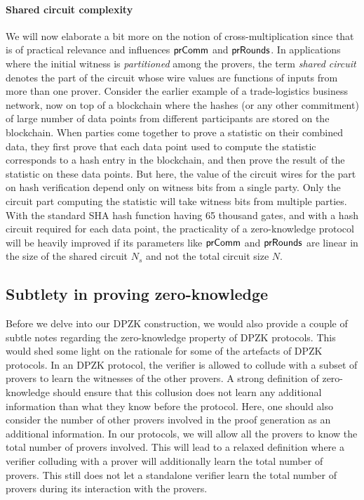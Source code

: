 \paragraph{Shared circuit complexity}
We will now elaborate a bit more on the notion of cross-multiplication since that is of practical relevance and influences $\mathsf{prComm}$ and $\mathsf{prRounds}$. In applications where the initial witness is \textit{partitioned} among the provers, the term \textit{shared circuit} denotes the part of the circuit whose wire values are functions of inputs from more than one prover. Consider the earlier example of a trade-logistics business network, now on top of a blockchain where the hashes (or any other commitment) of large number of data points from different participants are stored on the blockchain. When parties come together to prove a statistic on their combined data, they first prove that each data point used to compute the statistic corresponds to a hash entry in the blockchain, and then prove the result of the statistic on these data points. But here, the value of the circuit wires for the part on hash verification depend only on witness bits from a single party. Only the circuit part computing the statistic will take witness bits from multiple parties. With the standard SHA hash function having 65 thousand gates, and with a hash circuit required for each data point, the practicality of a zero-knowledge protocol will be heavily improved if its parameters like $\mathsf{prComm}$ and $\mathsf{prRounds}$ are linear in the size of the shared circuit $N_s$ and not the total circuit size $N$.


\subsection{Subtlety in proving zero-knowledge}
Before we delve into our DPZK construction, we would also provide a couple of subtle notes regarding the zero-knowledge property of DPZK protocols. This would shed some light on the rationale for some of the artefacts of DPZK protocols. In an DPZK protocol, the verifier is allowed to collude with a subset of provers to learn the witnesses of the other provers. A strong definition of zero-knowledge should ensure that this collusion does not learn any additional information than what they know before the protocol. Here, one should also consider the number of other provers involved in the proof generation as an additional information. In our protocols, we will allow all the provers to know the total number of provers involved. This will lead to a relaxed definition where a verifier colluding with a prover will additionally learn the total number of provers. This still does not let a standalone verifier learn the total number of provers during its interaction with the provers.


